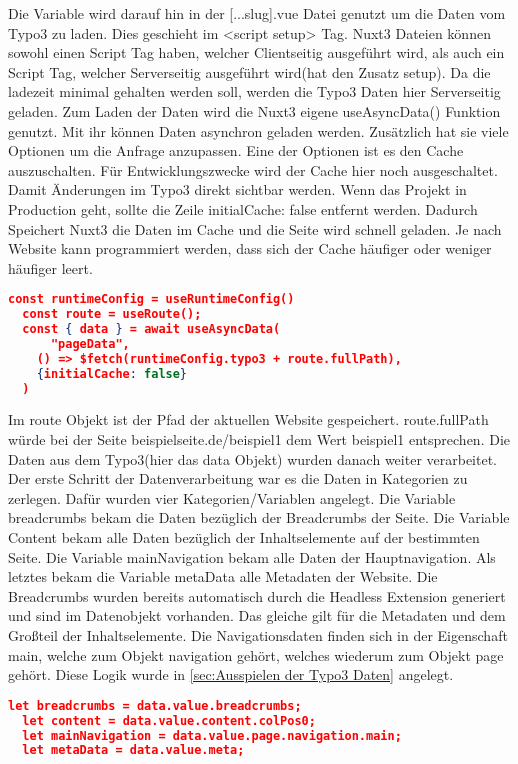Die Variable wird darauf hin in der [...slug].vue Datei genutzt um die Daten vom Typo3 zu laden. Dies geschieht im <script setup> Tag. Nuxt3 Dateien können sowohl einen Script Tag haben, welcher Clientseitig ausgeführt wird, als auch ein Script Tag, welcher Serverseitig ausgeführt wird(hat den Zusatz setup). Da die ladezeit minimal gehalten werden soll, werden die Typo3 Daten hier Serverseitig geladen. Zum Laden der Daten wird die Nuxt3 eigene useAsyncData() Funktion genutzt. Mit ihr können Daten asynchron geladen werden. Zusätzlich hat sie viele Optionen um die Anfrage anzupassen. Eine der Optionen ist es den Cache auszuschalten. Für Entwicklungszwecke wird der Cache hier noch ausgeschaltet. Damit Änderungen im Typo3 direkt sichtbar werden. Wenn das Projekt in Production geht, sollte die Zeile {initialCache: false} entfernt werden. Dadurch Speichert Nuxt3 die Daten im Cache und die Seite wird schnell geladen. Je nach Website kann programmiert werden, dass sich der Cache häufiger oder weniger häufiger leert.

\begin{lstlisting}[language=json,firstnumber=1]
  const runtimeConfig = useRuntimeConfig()
  const route = useRoute();
  const { data } = await useAsyncData(
      "pageData",
    () => $fetch(runtimeConfig.typo3 + route.fullPath),
    {initialCache: false}
  )
\end{lstlisting}

Im route Objekt ist der Pfad der aktuellen Website gespeichert. route.fullPath würde bei der Seite beispielseite.de/beispiel1 dem Wert beispiel1 entsprechen.
Die Daten aus dem Typo3(hier das data Objekt) wurden danach weiter verarbeitet. Der erste Schritt der Datenverarbeitung war es die Daten in Kategorien zu zerlegen. Dafür wurden vier Kategorien/Variablen angelegt. Die Variable breadcrumbs bekam die Daten bezüglich der Breadcrumbs der Seite. Die Variable Content bekam alle Daten bezüglich der Inhaltselemente auf der bestimmten Seite. Die Variable mainNavigation bekam alle Daten der Hauptnavigation. Als letztes bekam die Variable metaData alle Metadaten der Website. Die Breadcrumbs wurden bereits automatisch durch die Headless Extension generiert und sind im Datenobjekt vorhanden. Das gleiche gilt für die Metadaten und dem Großteil der Inhaltselemente. Die Navigationsdaten finden sich in der Eigenschaft main, welche zum Objekt navigation gehört, welches wiederum zum Objekt page gehört. Diese Logik wurde in \ref{sec:Ausspielen der Typo3 Daten} angelegt.

\begin{lstlisting}[language=json,firstnumber=1]
  let breadcrumbs = data.value.breadcrumbs;
  let content = data.value.content.colPos0;
  let mainNavigation = data.value.page.navigation.main;
  let metaData = data.value.meta;
\end{lstlisting}

